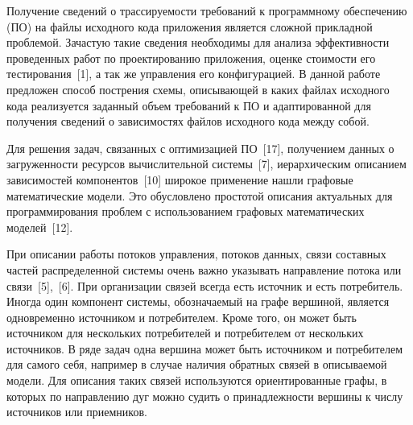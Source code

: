 



Получение сведений о трассируемости требований к программному обеспечению (ПО) на файлы исходного кода приложения является сложной прикладной проблемой. Зачастую такие сведения необходимы для анализа эффективности проведенных работ по проектированию приложения, оценке стоимости его тестирования~[1], а так же управления его конфигурацией. В данной работе предложен способ пострения схемы, описывающей в каких файлах исходного кода реализуется заданный объем требований к ПО и адаптированной для получения сведений о зависимостях файлов исходного кода между собой.

Для решения задач, связанных с оптимизацией ПО~[17], получением данных о загруженности ресурсов вычислительной системы~[7], иерархическим описанием зависимостей компонентов~[10] широкое применение нашли графовые математические модели. Это обусловлено простотой описания актуальных для программирования проблем с использованием графовых математических моделей~[12].

При описании работы потоков управления, потоков данных, связи составных частей распределенной системы очень важно указывать направление потока или связи~[5],~[6]. При организации связей всегда есть источник и есть потребитель. Иногда один компонент системы, обозначаемый на графе вершиной, является одновременно источником и потребителем. Кроме того, он может быть источником для нескольких потребителей и потребителем от нескольких источников. В ряде задач одна вершина может быть источником и потребителем для самого себя, например в случае наличия обратных связей в описываемой модели. Для описания таких связей используются ориентированные графы, в которых по направлению дуг можно судить о принадлежности вершины к числу источников или приемников.

